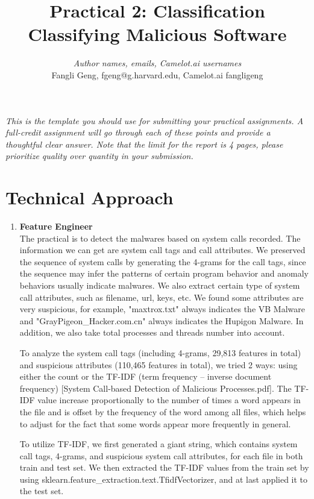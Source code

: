 \documentclass[11pt]{article}
\title{Practical 2: Classification\\ Classifying Malicious Software}
\author{\textit{Author names, emails, Camelot.ai usernames}\\
Fangli Geng, fgeng@g.harvard.edu, Camelot.ai fangligeng}
\begin{document}
\maketitle{}


\noindent \textit{This is the template you should use for submitting your practical assignments. 
A full-credit assignment will go through each of these points and provide a thoughtful 
clear answer.  Note that the limit for the report is 4 pages, please prioritize quality over 
quantity in your submission.}

\section{Technical Approach}
\begin{enumerate}
\item \textbf{Feature Engineer}\\
The practical is to detect the malwares based on system calls recorded. The information we can get are system call tags and call attributes. We preserved the sequence of system calls by generating the 4-grams for the call tags, since the sequence may infer the patterns of certain program behavior and anomaly behaviors usually indicate malwares. We also extract certain type of system call attributes, such as filename, url, keys, etc. We found some attributes are very suspicious, for example, "maxtrox.txt" always indicates the VB Malware and "GrayPigeon\_Hacker.com.cn" always indicates the Hupigon Malware. In addition, we also take total processes and threads number into account.

To analyze the system call tags (including 4-grams, 29,813 features in total) and suspicious attributes (110,465 features in total), we tried 2 ways: using either the count or the TF-IDF (term frequency – inverse document frequency) [System Call-based Detection of Malicious Processes.pdf]. The TF-IDF value increase proportionally to the number of times a word appears in the file and is offset by the frequency of the word among all files, which helps to adjust for the fact that some words appear more frequently in general.

To utilize TF-IDF, we first generated a giant string, which contains system call tags, 4-grams, and suspicious system call attributes, for each file in both train and test set. We then extracted the TF-IDF values from the train set by using sklearn.feature\_extraction.text.TfidfVectorizer, and at last applied it to the test set. 


\end{enumerate}
\end{document}
